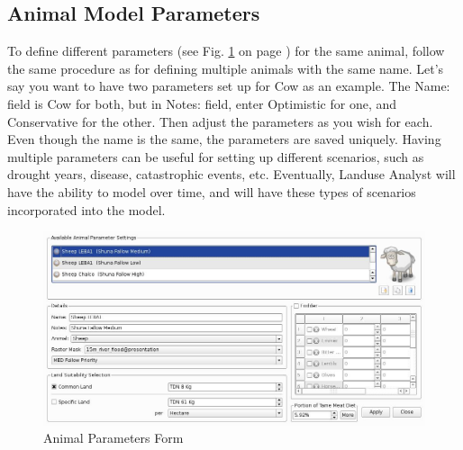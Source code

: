   \subsection{Animal Model Parameters}
To define different parameters (see Fig. \ref{fig:animalParameters} on page
\pageref{fig:animalParameters}) for the same animal, follow the same procedure
as for defining multiple animals with the same name. Let's say you want to have
two parameters set up for Cow as an example. The Name: field is Cow for both,
but in Notes: field, enter Optimistic for one, and Conservative for the other.
Then adjust the parameters as you wish for each. Even though the name is the
same, the parameters are saved uniquely. Having multiple parameters can be
useful for setting up different scenarios, such as drought years, disease,
catastrophic events, etc. Eventually, Landuse Analyst will have the ability to
model over time, and will have these types of scenarios incorporated into the
model.

\begin{figure}[ht]
    \includegraphics[scale=.23]{./images/animalParameters.jpg}
  \caption{\label{fig:animalParameters}Animal Parameters Form}
\end{figure}

